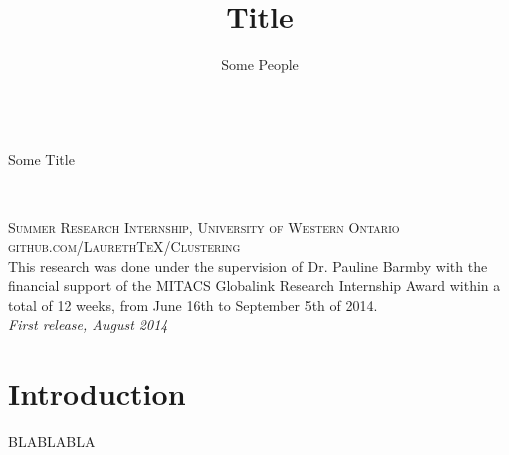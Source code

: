 \documentclass{awesome} %
\makeatletter
\newcommand{\subtitle}[1]{\def\@subtitle{#1}}
\makeatother
\begin{document}

\title{Title}
\subtitle{Some Title}
\author{\Large Some People}

\begingroup
\thispagestyle{empty}
\centering
\vspace*{5cm}
\par\normalfont\fontsize{35}{35}\sffamily\selectfont
\textbf{\thetitle}\\
{\LARGE\@subtitle}\par
\vspace*{1cm}
{\theauthor}\par
\endgroup


\newpage
~\vfill
\thispagestyle{empty}


\noindent \textsc{Summer Research Internship, University of Western Ontario}\\

\noindent \textsc{github.com/LaurethTeX/Clustering}\\ %

\noindent This research was done under the supervision of Dr. Pauline Barmby with the financial support of the MITACS Globalink Research Internship Award within a total of 12 weeks, from June 16th to September 5th of 2014.\\ %

\noindent \textit{First release, August 2014} %



\tableofcontents

\chapter{Introduction}
BLABLABLA

\nocite{*}
\printbibliography
\end{document}
